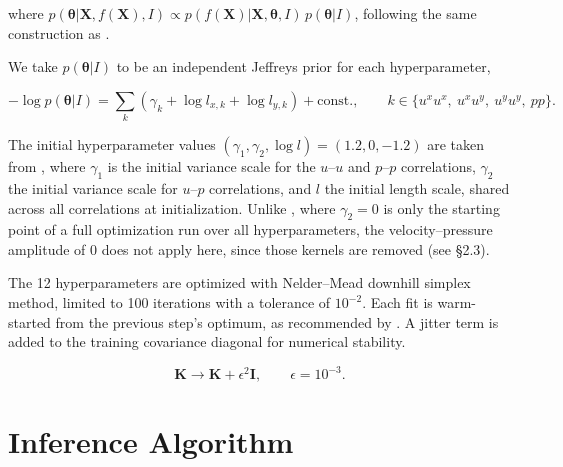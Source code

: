 \documentclass[11pt, a4paper]{report}
\begin{document}
\noindent where \(p(\boldsymbol{\theta}|\boldsymbol{X},f(\boldsymbol{X}),I) \propto
p(f(\boldsymbol{X})|\boldsymbol{X},\boldsymbol{\theta},I)\,p(\boldsymbol{\theta}|I)\), following
the same construction as \textcite{Molina2023}.

We take \(p(\boldsymbol{\theta}|I)\) to be an
independent Jeffreys prior for each hyperparameter,

\begin{equation}
    -\log p(\boldsymbol{\theta}|I) = \sum_{k} \left( \gamma_k + \log l_{x,k} + \log l_{y,k} \right) + \text{const.},
    \qquad k \in \{u^xu^x,\ u^xu^y,\ u^yu^y,\ pp\}.
\end{equation}
\vspace{0.3cm}

\vspace{0.3cm}
The initial hyperparameter values \((\gamma_1, \gamma_2, \log l) = (1.2, 0, -1.2)\)
are taken from \textcite{Molina2023}, where \(\gamma_1\) is the initial variance scale
for the \(u\)--\(u\) and \(p\)--\(p\) correlations, \(\gamma_2\) the initial variance
scale for \(u\)--\(p\) correlations, and \(l\) the initial length scale, shared across
all correlations at initialization. Unlike \textcite{Molina2023}, where \(\gamma_2 = 0\)
is only the starting point of a full optimization run over all hyperparameters, the
velocity--pressure amplitude of 0 does not apply here, since those kernels are removed
(see §2.3).

The 12 hyperparameters are optimized with Nelder--Mead downhill simplex method, limited to
100 iterations with a tolerance of \(10^{-2}\). Each fit is warm-started from the previous step's optimum,
as recommended by \textcite{Raissi2018}. A jitter term is added to the training covariance diagonal for numerical stability.

\begin{equation}
    \boldsymbol{K} \to \boldsymbol{K} + \epsilon^2\boldsymbol{I}, \qquad \epsilon = 10^{-3}.
\end{equation}

\section{Inference Algorithm}
\label{sec:inference-algorithm}
\end{document}
